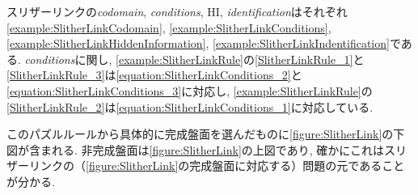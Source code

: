 \begin{example}[スリザーリンクの数学的記述]
  スリザーリンクの\textit{codomain}, \textit{conditions}, HI, \textit{identification}はそれぞれ\cref{example:SlitherLinkCodomain}, \cref{example:SlitherLinkConditions}, \cref{example:SlitherLinkHiddenInformation}, \cref{example:SlitherLinkIndentification}である. \textit{conditions}に関し, \cref{example:SlitherLinkRule}の\ref{SlitherLinkRule_1}と\ref{SlitherLinkRule_3}は\cref{equation:SlitherLinkConditions_2}と\cref{equation:SlitherLinkConditions_3}に対応し, \cref{example:SlitherLinkRule}の\ref{SlitherLinkRule_2}は\cref{equation:SlitherLinkConditions_1}に対応している.

  このパズルルールから具体的に完成盤面を選んだものに\cref{figure:SlitherLink}の下図が含まれる. 非完成盤面は\cref{figure:SlitherLink}の上図であり, 確かにこれはスリザーリンクの（\cref{figure:SlitherLink}の完成盤面に対応する）問題の元であることが分かる.
\end{example}

